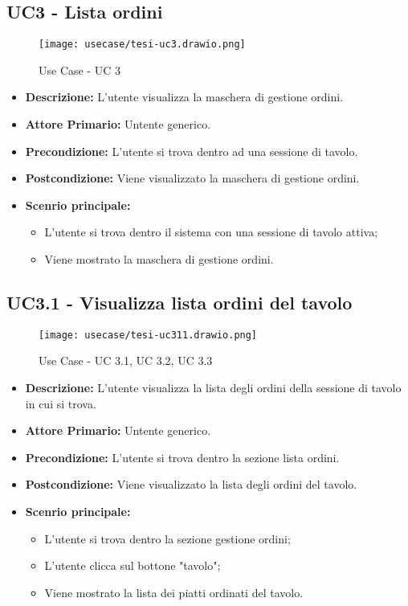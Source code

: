 \subsection{UC3 - Lista ordini}
\begin{figure}[H]
    \centering
    \texttt{[image: usecase/tesi-uc3.drawio.png]}
    \caption{Use Case - UC 3}
\end{figure}
\begin{itemize}
    \item \textbf{Descrizione:} L'utente visualizza la maschera di gestione ordini.
    \item \textbf{Attore Primario:} Untente generico.
    \item \textbf{Precondizione:} L'utente si trova dentro ad una sessione di tavolo.
    \item \textbf{Postcondizione:} Viene visualizzato la maschera di gestione ordini.
    \item \textbf{Scenrio principale:}
    \begin{itemize}
        \item L'utente si trova dentro il sistema con una sessione di tavolo attiva;
        \item Viene mostrato la maschera di gestione ordini.
    \end{itemize}
\end{itemize}
\subsection{UC3.1 - Visualizza lista ordini del tavolo}
\begin{figure}[H]
    \centering
    \texttt{[image: usecase/tesi-uc311.drawio.png]}
    \caption{Use Case - UC 3.1, UC 3.2, UC 3.3}
\end{figure}
\begin{itemize}
    \item \textbf{Descrizione:} L'utente visualizza la lista degli ordini della sessione di tavolo in cui si trova. 
    \item \textbf{Attore Primario:} Untente generico.
    \item \textbf{Precondizione:} L'utente si trova dentro la sezione lista ordini.
    \item \textbf{Postcondizione:} Viene visualizzato la lista degli ordini del tavolo.
    \item \textbf{Scenrio principale:}
    \begin{itemize}
        \item L'utente si trova dentro la sezione gestione ordini;
        \item L'utente clicca sul bottone "tavolo";
        \item Viene mostrato la lista dei piatti ordinati del tavolo.
    \end{itemize}
\end{itemize}

